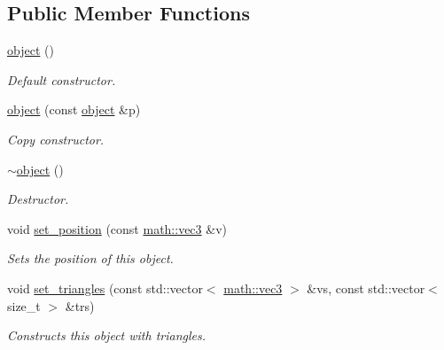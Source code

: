 \subsection*{Public Member Functions}
\begin{DoxyCompactItemize}
\item 
\mbox{\label{classphysim_1_1geometric_1_1object_aa6db7d14fdf7c82dfdbd1f309aefa23b}} 
\hyperlink{classphysim_1_1geometric_1_1object_aa6db7d14fdf7c82dfdbd1f309aefa23b}{object} ()
\begin{DoxyCompactList}\small\item\em Default constructor. \end{DoxyCompactList}\item 
\mbox{\label{classphysim_1_1geometric_1_1object_a5fbc926d0a13708ec44d4dd06183d8c1}} 
\hyperlink{classphysim_1_1geometric_1_1object_a5fbc926d0a13708ec44d4dd06183d8c1}{object} (const \hyperlink{classphysim_1_1geometric_1_1object}{object} \&p)
\begin{DoxyCompactList}\small\item\em Copy constructor. \end{DoxyCompactList}\item 
\mbox{\label{classphysim_1_1geometric_1_1object_a1a013449e416aa0df0b9859fe6c31548}} 
\hyperlink{classphysim_1_1geometric_1_1object_a1a013449e416aa0df0b9859fe6c31548}{$\sim$object} ()
\begin{DoxyCompactList}\small\item\em Destructor. \end{DoxyCompactList}\item 
void \hyperlink{classphysim_1_1geometric_1_1object_ab1efcebf4013206cee817beeb0415cd6}{set\+\_\+position} (const \hyperlink{structphysim_1_1math_1_1vec3}{math\+::vec3} \&v)
\begin{DoxyCompactList}\small\item\em Sets the position of this object. \end{DoxyCompactList}\item 
void \hyperlink{classphysim_1_1geometric_1_1object_a637c4792d486f76fb0c0dabeb0b468ea}{set\+\_\+triangles} (const std\+::vector$<$ \hyperlink{structphysim_1_1math_1_1vec3}{math\+::vec3} $>$ \&vs, const std\+::vector$<$ size\+\_\+t $>$ \&trs)
\begin{DoxyCompactList}\small\item\em Constructs this object with triangles. \end{DoxyCompactList}\item 

\end{DoxyCompactItemize}
